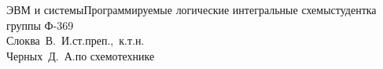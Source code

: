 


\usepackage{color}
\usepackage[colorlinks,linkcolor=black,filecolor=blue,citecolor=darkgreen]{hyperref}


    {ЭВМ и системы}{Программируемые логические интегральные схемы}{студентка группы
    Ф-369\\Слоква~В.~И.}{ст.преп.,~к.т.н.\\Черных~Д.~А.}{по схемотехнике}
        
    \tableofcontents
    \thispagestyle{empty}
    \newpage
    
